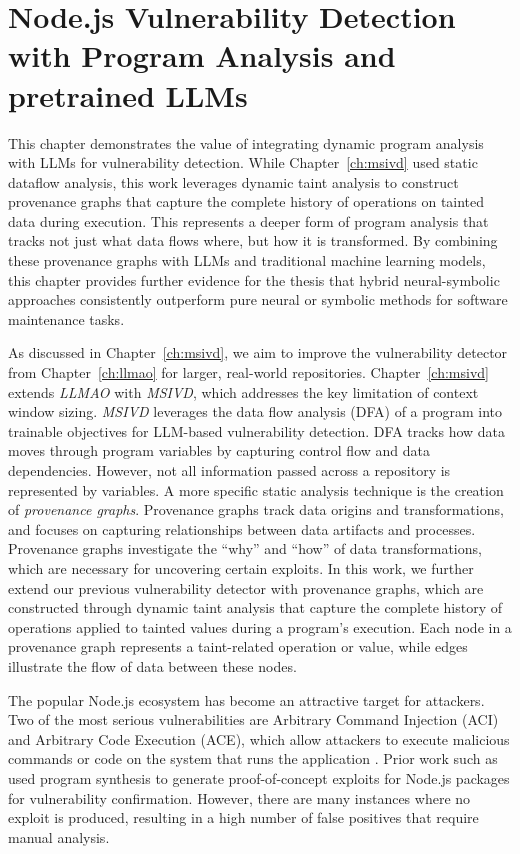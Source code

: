 \documentclass[12pt,openany,oneside,table]{cmuthesis}
\begin{document}
\chapter{Node.js Vulnerability Detection with Program Analysis and pretrained LLMs}
\label{ch:nodejs}

This chapter demonstrates the value of integrating dynamic program analysis with LLMs for vulnerability detection. While Chapter~\ref{ch:msivd} used static dataflow analysis, this work leverages dynamic taint analysis to construct provenance graphs that capture the complete history of operations on tainted data during execution. This represents a deeper form of program analysis that tracks not just what data flows where, but how it is transformed. By combining these provenance graphs with LLMs and traditional machine learning models, this chapter provides further evidence for the thesis that hybrid neural-symbolic approaches consistently outperform pure neural or symbolic methods for software maintenance tasks.

As discussed in Chapter~\ref{ch:msivd}, we aim to improve the vulnerability detector from Chapter~\ref{ch:llmao} for larger, real-world repositories. Chapter~\ref{ch:msivd} extends \textit{LLMAO} with \textit{MSIVD}, which addresses the key limitation of context window sizing. \textit{MSIVD} leverages the data flow analysis (DFA) of a program into trainable objectives for LLM-based vulnerability detection. DFA tracks how data moves through program variables by capturing control flow and data dependencies. However, not all information passed across a repository is represented by variables. A more specific static analysis technique is the creation of \textit{provenance graphs}. Provenance graphs track data origins and transformations, and focuses on capturing relationships between data artifacts and processes. Provenance graphs investigate the ``why'' and ``how'' of data transformations, which are necessary for uncovering certain exploits. In this work, we further extend our previous vulnerability detector with provenance graphs, which are constructed through dynamic taint analysis that capture the
complete history of operations applied to tainted values during a program’s execution. Each node in a provenance graph represents a taint-related operation or value, while edges illustrate the flow of data between these nodes.

The popular Node.js ecosystem has become an attractive target for attackers. Two of the most serious vulnerabilities are Arbitrary Command Injection (ACI) and Arbitrary Code Execution (ACE), which allow attackers to execute malicious commands or code on the system that runs the application \cite{cwe_94, cwe_77}. Prior work such as \nodemedicfine used program synthesis to generate proof-of-concept exploits for Node.js packages for vulnerability confirmation. However, there are many instances where no exploit is produced, resulting in a high number of false positives that require manual analysis. 
\end{document}
